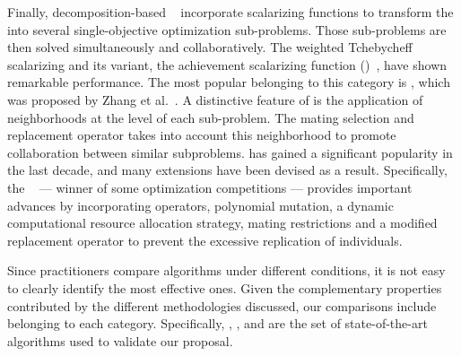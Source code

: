 Finally, decomposition-based \MOEAS{}~\cite{ishibuchi1998multi} incorporate scalarizing functions to transform the \MOP{} 
into several single-objective optimization sub-problems.
%
Those sub-problems are then solved simultaneously and collaboratively.
%
The weighted Tchebycheff scalarizing and its variant, the achievement scalarizing function (\ASF{})~\cite{hernandez2015improved,Pescador:17},
have shown remarkable performance.
%
The most popular \MOEA{} belonging to this category is \MOEAD{}, which was proposed by Zhang et al.~\cite{zhang2007moea}.
%
A distinctive feature of \MOEAD{} is the application of neighborhoods at the level of each sub-problem.
%
The mating selection and replacement operator takes into account this neighborhood to promote collaboration
between similar subproblems.
%
\MOEAD{} has gained a significant popularity in the last decade, and many extensions have been devised as a result.
%
Specifically, the \MOEADDE{}~\cite{li2009multiobjective} --- winner of some optimization competitions --- provides
important advances by incorporating \DE{} operators, polynomial mutation, a dynamic computational resource allocation strategy, 
mating restrictions and a modified replacement operator to prevent the excessive replication of individuals. 

Since practitioners compare algorithms under different conditions, it is not easy to clearly identify the most effective ones.
%
Given the complementary properties contributed by the different methodologies discussed, our comparisons include \MOEAS{} belonging
to each category. Specifically, \NSGAII{}, \NSGAIII{}, \RMOEA{} and \MOEADDE{} are the set of state-of-the-art algorithms used
to validate our proposal.
